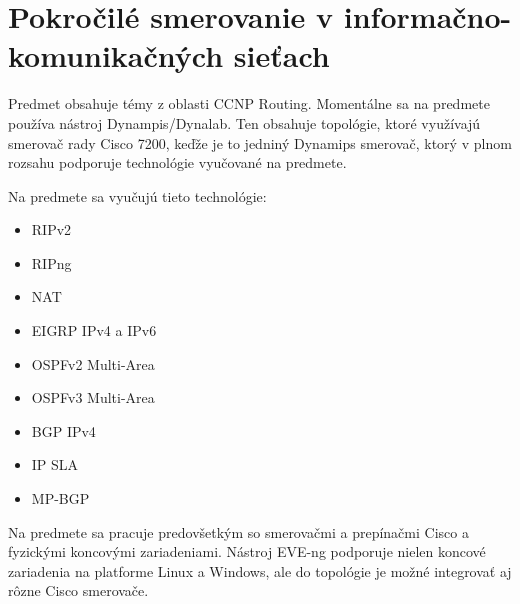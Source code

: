 \section{Pokročilé smerovanie v informačno-komunikačných sieťach}

Predmet obsahuje témy z oblasti CCNP Routing. Momentálne sa na predmete používa nástroj Dynampis/Dynalab. Ten obsahuje topológie, ktoré využívajú smerovač rady Cisco 7200, keďže je to jedniný Dynamips smerovač, ktorý v plnom rozsahu podporuje technológie vyučované na predmete.

Na predmete sa vyučujú tieto technológie:

\begin{itemize}
    \item RIPv2
    \item RIPng
    \item NAT
    \item EIGRP IPv4 a IPv6
    \item OSPFv2 Multi-Area
    \item OSPFv3 Multi-Area
    \item BGP IPv4
    \item IP SLA
    \item MP-BGP
\end{itemize}

Na predmete sa pracuje predovšetkým so smerovačmi a prepínačmi Cisco a fyzickými koncovými zariadeniami. Nástroj EVE-ng podporuje nielen koncové zariadenia na platforme Linux a Windows, ale do topológie je možné integrovať aj rôzne Cisco smerovače.